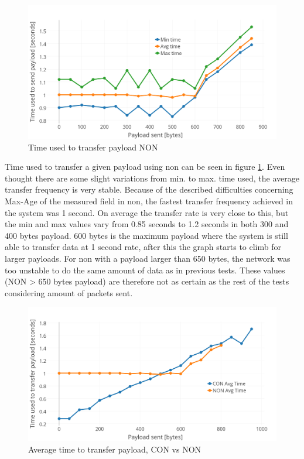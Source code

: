 
\begin{figure}[h!]
    \centering
    \includegraphics[width=1.0\textwidth]{bytesPrSecondNewNON.png}    
    \caption{Time used to transfer payload NON}
    \label{fig:bytesPRSecond4}
\end{figure}

\noindent Time used to transfer a given payload using \gls{non} can be seen in figure \ref{fig:bytesPRSecond4}. Even thought there are some slight variations from min. to max. time used, the average transfer frequency is very stable. Because of the described difficulties concerning Max-Age of the measured field in \gls{non}, the fastest transfer frequency achieved in the system was 1 second. On average the transfer rate is very close to this, but the min and max values vary from 0.85 seconds to 1.2 seconds in both 300 and 400 bytes payload. 600 bytes is the maximum payload where the system is still able to transfer data at 1 second rate, after this the graph starts to climb for larger payloads. For \gls{non} with a payload larger than 650 bytes, the network was too unstable to do the same amount of data as in previous tests. These values (NON > 650 bytes payload) are therefore not as certain as the rest of the tests considering amount of packets sent.


\begin{figure}[h!]
    \centering
    \includegraphics[width=1.0\textwidth]{avgTimeCONNON.png}    
    \caption{Average time to transfer payload, CON vs NON}
    \label{fig:avgTimeCONNON}
\end{figure}




